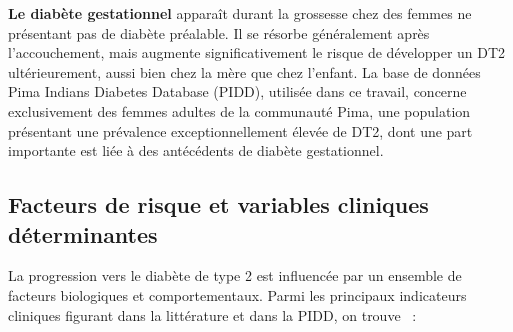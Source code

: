 \textbf{Le diabète gestationnel} apparaît durant la grossesse chez des femmes ne présentant
pas de diabète préalable. Il se résorbe généralement après l'accouchement, mais augmente
significativement le risque de développer un DT2 ultérieurement, aussi bien chez la mère
que chez l'enfant. La base de données Pima Indians Diabetes Database (PIDD), utilisée dans
ce travail, concerne exclusivement des femmes adultes de la communauté Pima, une population
présentant une prévalence exceptionnellement élevée de DT2, dont une part importante est
liée à des antécédents de diabète gestationnel.

\subsection*{Facteurs de risque et variables cliniques déterminantes}

La progression vers le diabète de type 2 est influencée par un ensemble de facteurs
biologiques et comportementaux. Parmi les principaux indicateurs cliniques figurant dans la
littérature et dans la PIDD, on trouve~\citep{zou2018, iparraguirre2023} :

